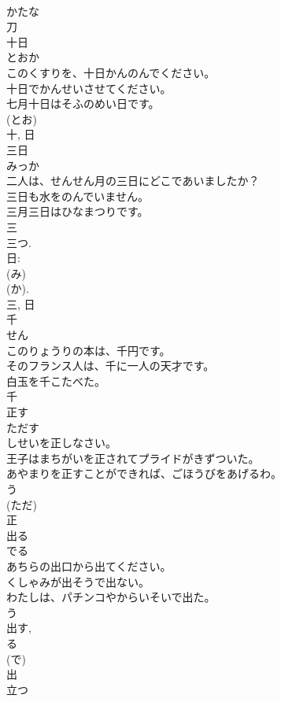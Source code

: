 \documentclass[8pt]{extreport}
\begin{document}
\begin{CJK}{UTF8}{min}
\\	かたな 
\\	刀	
\\	十日	
\\	とおか	
\\	このくすりを、十日かんのんでください。	
\\	十日でかんせいさせてください。	
\\	七月十日はそふのめい日です。	
\\	(とお) 
\\	十, 日	
\\	三日	
\\	みっか	
\\	二人は、せんせん月の三日にどこであいましたか？	
\\	三日も水をのんでいません。	
\\	三月三日はひなまつりです。	
\\	三 
\\	三つ. 
\\	日: 
\\	(み) 
\\	(か). 
\\	三, 日	
\\	千	
\\	せん	
\\	このりょうりの本は、千円です。	
\\	そのフランス人は、千に一人の天才です。	
\\	白玉を千こたべた。	
\\	千	
\\	正す	
\\	ただす	
\\	しせいを正しなさい。	
\\	王子はまちがいを正されてプライドがきずついた。	
\\	あやまりを正すことができれば、ごほうびをあげるわ。	
\\	う 
\\	(ただ) 
\\	正	
\\	出る	
\\	でる	
\\	あちらの出口から出てください。	
\\	くしゃみが出そうで出ない。	
\\	わたしは、パチンコやからいそいで出た。	
\\	う 
\\	出す, 
\\	る 
\\	(で) 
\\	出	
\\	立つ	

\end{CJK}
\end{document}
